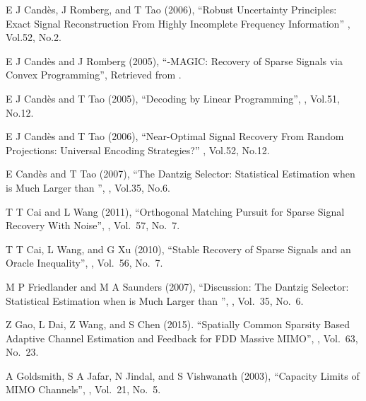 \item E J Cand\`es, J Romberg, and T Tao (2006), ``Robust Uncertainty Principles: Exact Signal Reconstruction From Highly Incomplete Frequency Information'' , Vol.52, No.2.

\item E J Cand\`es and J Romberg (2005), ``-MAGIC: Recovery of Sparse Signals via Convex Programming'', Retrieved from .

\item E J Cand\`es and T Tao (2005), ``Decoding by Linear Programming'', , Vol.51, No.12.

\item E J Cand\`es and T Tao (2006), ``Near-Optimal Signal Recovery From Random Projections: Universal Encoding Strategies?'' , Vol.52, No.12.

\item E Cand\`es and T Tao (2007), ``The Dantzig Selector: Statistical Estimation when  is Much Larger than '', , Vol.35, No.6.

\item T T Cai and L Wang (2011), ``Orthogonal Matching Pursuit for Sparse Signal Recovery With Noise'', , Vol.\ 57, No.\ 7.

\item T T Cai, L Wang, and G Xu (2010), ``Stable Recovery of Sparse Signals and an Oracle Inequality'', , Vol.\ 56, No.\ 7.

\item M P Friedlander and M A Saunders (2007), ``Discussion: The Dantzig Selector: Statistical Estimation when  is Much Larger than '', , Vol.\ 35, No.\ 6.

\item Z Gao, L Dai, Z Wang, and S Chen (2015). ``Spatially Common Sparsity Based Adaptive Channel Estimation and Feedback for FDD Massive MIMO'', , Vol.\ 63, No.\ 23.

\item A Goldsmith, S A Jafar, N Jindal, and S Vishwanath (2003), ``Capacity Limits of MIMO Channels'', , Vol.\ 21, No.\ 5.

